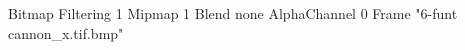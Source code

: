 {Bitmap
	{Filtering 1}
	{Mipmap 1}
	{Blend none}
	{AlphaChannel 0}
	{Frame "6-funt cannon_x.tif.bmp"}
}
